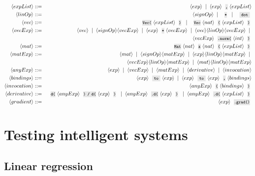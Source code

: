 \begin{eqnarray*}
\bnfrl{expList} & ::= & \bnfrl{exp} \mor \bnfrl{exp} \code{,} \bnfrl{expList} \\
\bnfrl{linOp} & ::= & \bnfrl{signOp} \mor \code{*} \mor \code{ dot } \\
\bnfrl{vec} & ::= & \code{Vec(} \bnfrl{expList} \code{)} \mor \code{Vec} \bnfrl{nat} \code{(} \bnfrl{expList} \code{)} \\
\bnfrl{vecExp} & ::= & \bnfrl{vec} \mor \bnfrl{signOp}\bnfrl{vecExp} \mor \bnfrl{exp} \code{*} \bnfrl{vecExp} \mor \bnfrl{vec} \bnfrl{linOp} \bnfrl{vecExp} \mor \\
&&\bnfrl{vecExp}\code{.norm(}\bnfrl{int}\code{)} \\
\bnfrl{mat} & ::= & \code{Mat} \bnfrl{nat} \code{x} \bnfrl{nat} \code{(} \bnfrl{expList} \code{)} \\
\bnfrl{matExp} & ::= & \bnfrl{mat} \mor \bnfrl{signOp}\bnfrl{matExp} \mor \bnfrl{exp}\bnfrl{linOp}\bnfrl{matExp} \mor \\
&&\bnfrl{vecExp}\bnfrl{linOp}\bnfrl{matExp} \mor \bnfrl{mat} \bnfrl{linOp} \bnfrl{matExp} \\
\bnfrl{anyExp} & ::= & \bnfrl{exp} \mor \bnfrl{vecExp} \mor \bnfrl{matExp} \mor \bnfrl{derivative} \mor \bnfrl{invocation} \\
\bnfrl{bindings} & ::= & \bnfrl{exp} \code{ to } \bnfrl{exp} \mor \bnfrl{exp} \code{ to } \bnfrl{exp} \code{,} \bnfrl{bindings} \\
\bnfrl{invocation} & ::= & \bnfrl{anyExp} \code{(} \bnfrl{bindings} \code{)} \\
\bnfrl{derivative} & ::= & \code{d(} \bnfrl{anyExp} \code{) / d(} \bnfrl{exp} \code{)} \mor \bnfrl{anyExp} \code{.d(} \bnfrl{exp} \code{)} \mor \bnfrl{anyExp} \code{.d(} \bnfrl{expList} \code{)} \\
\bnfrl{gradient} & ::= & \bnfrl{exp} \code{.grad()}
\end{eqnarray*}

\chapter{Testing intelligent systems}

\section{Linear regression}\label{sec:lin_reg}

